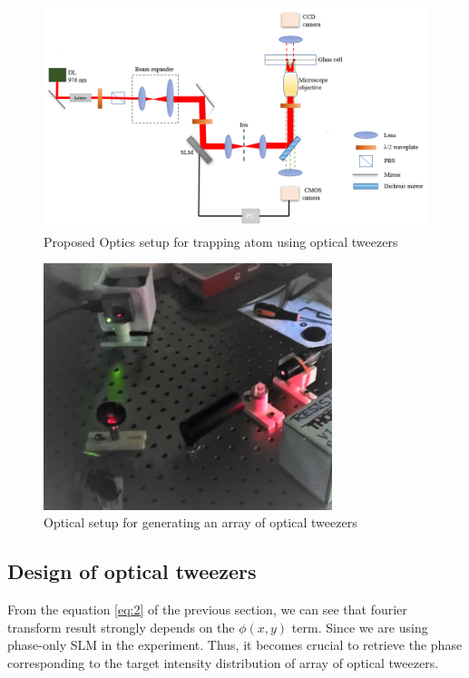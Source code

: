 \begin{figure}[H]
\centering
\includegraphics[width=\textwidth]{img/expsetup - Copy.png}
\onehalfspacing
\caption{Proposed Optics setup for trapping atom using optical tweezers}
\label{fig:optical_setup_real}
\end{figure}
\vspace{1em}
\begin{figure}[H]
\centering
\includegraphics[width=0.75\textwidth]{img/setup on optical table 2.jpeg}
\caption{Optical setup for generating an array of optical tweezers}
\label{fig:optical_setup_lab}
\end{figure}


\subsection{Design of optical tweezers}
From the equation \ref{eq:2} of the previous section, we can see that fourier transform result strongly depends on the $\phi(x,y)$ term. Since we are using phase-only SLM in the experiment. Thus, it becomes crucial to retrieve the phase corresponding to the target intensity distribution of array of optical tweezers.

